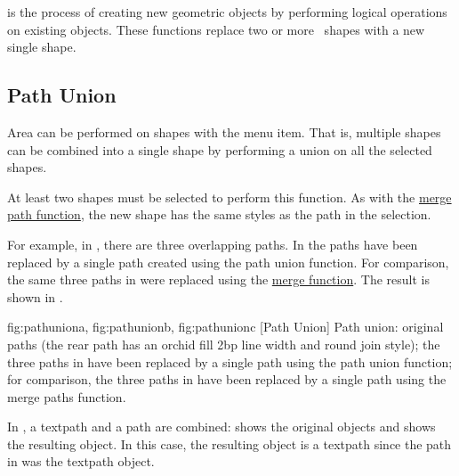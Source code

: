  is the process of creating new geometric objects by
performing logical operations on existing objects. These functions
replace two or more \selected\ \glspl*{shape} with a new single
\gls{shape}.

\subsection{Path Union}\label{sec:pathunion}


Area  can be performed on
\glspl{shape} with the  menu item. That is,
multiple \glspl{shape} can be combined into a single \gls*{shape} by
performing a union on all the selected \glspl*{shape}.

At least two \glspl*{shape} must be selected to perform this
function. As with the \hyperref[sec:mergepaths]{merge path function}, the
new shape has the same styles as the  path
in the selection.

For example, in , there are three
overlapping paths.  In  the paths have
been replaced by a single path created using the path union
function. For comparison, the same three paths in
 were replaced using the
\hyperref[sec:mergepaths]{merge function}. The result is shown in
.

{
  {fig:pathuniona}{}{},
  {fig:pathunionb}{}{},
  {fig:pathunionc}{}{}
}
[Path Union]
{Path union:
 original paths (the rear path has an
orchid fill  2bp line width and round join style);
 the three paths in
 have been replaced by a single path using
the path union function;
 for comparison, the three paths in
 have been replaced by a single path using
the merge paths function.}

In , a \gls*{textpath} and a
\gls*{path} are combined:  shows
the original objects and  shows
the resulting object. In this case, the resulting object is a
\gls*{textpath} since the  path in
 was the \gls*{textpath} object.

